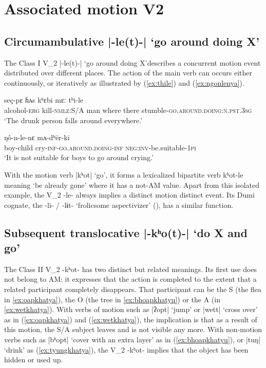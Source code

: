 \documentclass[oneside,a4paper,11pt]{article}
\newcommand{\ipa}[1]{{\phon#1}}
\newcommand{\dhatu}[2]{|\ipa{#1}| `#2'}
\begin{document}
\section{Associated motion V2}

\subsection{Circumambulative \dhatu{-le(t)-}{go around doing X}} \label{sec:v2.le}
The Class I V_2 \dhatu{-le(t)-}{go around doing X}describes a concurrent motion event distributed over different places. The action of the main verb can occurs either continuously, or iteratively as illustrated by (\ref{ex:thile}) and (\ref{ex:ngonlenya}). 

\begin{exe}
\ex \label{ex:thile}
 \gll  \ipa{tsi-ʔɛ} \ipa{seç-pɛ} \ipa{ɦʌs} \ipa{kʰɛbi} \ipa{mɛː} \ipa{tʰi-le} \\
 alcohol-\textsc{erg} kill-\textsc{nmlz}:S/A man where there stumble-\textsc{go.around.doing}:\textsc{n.pst.3sg} \\
 \glt `The drunk person falls around everywhere.' 
\end{exe}

\begin{exe}
\ex \label{ex:ngonlenya}
 \gll \ipa{lɛsbɛ-ʦɵ} \ipa{ŋô-n-le-nɛ} \ipa{mʌ-dʰēr-ki} \\
 boy-child cry-\textsc{inf}-\textsc{go.around.doing}-\textsc{inf} \textsc{neg}:\textsc{inv}-be.suitable-\textsc{1pi} \\
\glt `It is not suitable for boys to go around crying.' 
\end{exe}

With the motion verb \dhatu{kʰot}{go}, it forms a lexicalized bipartite verb \ipa{kʰot-le} meaning `be already gone' where it has a not-AM value. Apart from this isolated example, the V_2 \ipa{-le-} always implies a distinct motion distinct event. Its Dumi cognate, the \ipa{-li- / -lɨt-} `frolicsome aspectivizer' (\citealt[209-210]{driem93dumi}), has a similar function.

\subsection{Subsequent translocative \dhatu{-kʰo(t)-}{do X and go}} \label{sec:v2.khot}
The Class II V_2 \ipa{-kʰot-} has two distinct but related meanings. Its first use does not belong to AM: it expresses that the action is completed to the extent that a related participant completely disappears. That participant can be the S (the flea in \ref{ex:oapkhatya}), the O (the tree in \ref{ex:bhoapkhatyu}) or the A (in \ref{ex:wetkhatya}). With verbs of motion such as \dhatu{ʔopt}{jump} or \dhatu{wett}{cross over} as in (\ref{ex:oapkhatya}) and (\ref{ex:wetkhatya}), the implication is that as a result of this motion, the S/A subject leaves and is not visible any more. With non-motion verbs such as \dhatu{bʰopt}{cover with an extra layer}  as in (\ref{ex:bhoapkhatyu}), or \dhatu{tuŋ}{drink} as (\ref{ex:tyungkhatya}), the V_2  \ipa{-kʰot-} implies that the object has been hidden or used up. 
\end{document}
